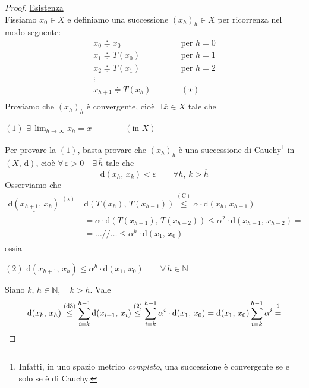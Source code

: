 \begin{proof}
\noindent\underline{Esistenza}\\
Fissiamo $x_0 \in X$ e definiamo una successione $(x_h)_h \in X$ per ricorrenza nel modo seguente:
$$
\begin{array}{lcr}
x_0 \doteqdot x_0 & \qquad & \text{per } h=0\\
x_1 \doteqdot T(x_0) & \qquad & \text{per } h=1\\
x_2 \doteqdot T(x_1) & \qquad & \text{per } h=2\\
\vdots & & \\
x_{h+1} \doteqdot T(x_h) & \qquad & (\star)\\
\end{array}
$$
Proviamo che $(x_h)_h$ è convergente, cioè $\exists \, \overline{x} \in X$ tale che
\begin{center}
$\mathrm{(1)}$
\hfill
$\displaystyle
\exists \, \lim_{h \rightarrow \infty} x_h = \overline{x} \qquad\qquad (\text{in } X)
$
\hfill \null \\
\end{center}
Per provare la $\mathrm{(1)}$, basta provare che $(x_h)_h$ è una successione di Cauchy\footnote{Infatti, in uno spazio metrico \emph{completo}, una successione è convergente se e solo se è di Cauchy.} in $(X,\,\mathrm{d})$, cioè $\forall \, \varepsilon > 0 \quad \exists \, \overline{h}$ tale che
$$
\mathrm{d}(x_h,\,x_k) < \varepsilon \qquad \forall h,\,k > \overline{h}
$$
Osserviamo che
$$
\begin{array}{rl}
\underline{\mathrm{d}(x_{h+1},\,x_h)} \overset{\mathrm{(\star)}}{=} & 
\mathrm{d}\left( T(x_h),\,T(x_{h-1}) \right) \overset{\mathrm{(C)}}{\leq}
\alpha \cdot \mathrm{d}(x_h,\,x_{h-1}) =\\
& = \alpha \cdot \mathrm{d}\left( T(x_{h-1}),\,T(x_{h-2}) \right) \leq
\alpha^2 \cdot \mathrm{d}(x_{h-1},\,x_{h-2}) =\\
& = \ldots//\ldots \leq \underline{\alpha^h \cdot \mathrm{d}(x_1,\,x_0)}
\end{array}
$$
ossia
\begin{center}
$\mathrm{(2)}$
\hfill
$\displaystyle
\mathrm{d}(x_{h+1},\,x_h) \leq \alpha^h \cdot \mathrm{d}(x_1,\,x_0) \qquad \forall \, h \in \mathbb{N}
$
\hfill \null \\
\end{center}
Siano $k,\,h \in \mathbb{N}, \quad k > h$. Vale
$$
\mathrm{d}(x_k,\,x_h) \overset{\mathrm{(d3)}}{\leq} 
\sum_{i=k}^{h-1} \mathrm{d}(x_{i+1},\,x_i) \overset{\mathrm{(2)}}{\leq}
\sum_{i=k}^{h-1} \alpha^i \cdot \mathrm{d}(x_1,\,x_0) =
\mathrm{d}(x_1,\,x_0) \sum_{i=k}^{h-1} \alpha^i \overset{\footnotemark}{=}
$$
\end{proof}
